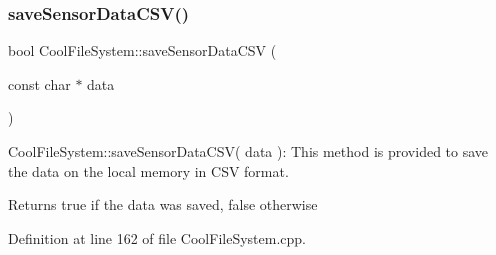 \subsubsection{\texorpdfstring{save\+Sensor\+Data\+C\+S\+V()}{saveSensorDataCSV()}}
{\footnotesize\ttfamily bool Cool\+File\+System\+::save\+Sensor\+Data\+C\+SV (\begin{DoxyParamCaption}\item[{const char $\ast$}]{data }\end{DoxyParamCaption})}

Cool\+File\+System\+::save\+Sensor\+Data\+C\+S\+V( data )\+: This method is provided to save the data on the local memory in C\+SV format.

\begin{DoxyReturn}{Returns}
true if the data was saved, false otherwise 
\end{DoxyReturn}


Definition at line 162 of file Cool\+File\+System.\+cpp.


